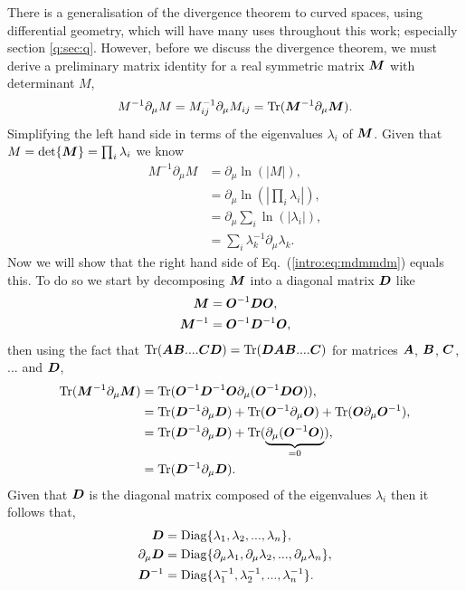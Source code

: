 There is a generalisation of the divergence theorem to curved spaces, using differential geometry, which will have many uses throughout this work; especially section \ref{q:sec:q}. However, before we discuss the divergence theorem, we must derive a preliminary matrix identity for a real symmetric matrix $\boldsymbol{M}$ with determinant $M$,
\begin{equation}\label{intro:eq:mdmmdm}
M^{-1} \partial_\mu M = M^{-1}_{ij} \partial_\mu M_{ij} = \mathrm{Tr}(\boldsymbol{M}^{-1} \partial_\mu \boldsymbol{M}).
\end{equation}
Simplifying the left hand side in terms of the eigenvalues $\lambda_i$ of $\boldsymbol{M}$. Given that $M=\det{\boldsymbol{M}}=\prod_i \lambda_i$ we know
\begin{align}
M^{-1} \partial_\mu M &= \partial_\mu \ln(|M|) ,\\
&= \partial_\mu \ln\left(\left| \prod_i \lambda_i\right|\right) ,\\
&= \partial_\mu \sum_i \ln(\left|  \lambda_i\right|) ,\\
&= \sum_i \lambda_k^{-1}\partial_\mu \lambda_k.
\end{align}
Now we will show that the right hand side of Eq.~(\ref{intro:eq:mdmmdm}) equals this. To do so we start by decomposing $\boldsymbol{M}$ into a diagonal matrix $\boldsymbol{D}$ like
\begin{align}
\boldsymbol{M} &= \boldsymbol{O}^{-1} \boldsymbol{D} \boldsymbol{O},\\
\boldsymbol{M}^{-1} &= \boldsymbol{O}^{-1} \boldsymbol{D}^{-1} \boldsymbol{O},
\end{align}
then using the fact that $\mathrm{Tr}(\boldsymbol{A} \boldsymbol{B} .... \boldsymbol{C}\boldsymbol{D}) = \mathrm{Tr}(\boldsymbol{D}\boldsymbol{A} \boldsymbol{B} .... \boldsymbol{C})$ for matrices $\boldsymbol{A}$, $ \boldsymbol{B}$, $ \boldsymbol{C}$, $...$ and $\boldsymbol{D}$,
\begin{align}
\mathrm{Tr}(\boldsymbol{M}^{-1} \partial_\mu \boldsymbol{M}) &= \mathrm{Tr}(\boldsymbol{O}^{-1} \boldsymbol{D}^{-1} \boldsymbol{O} \partial_\mu (\boldsymbol{O}^{-1} \boldsymbol{D} \boldsymbol{O})) ,\\
&= \mathrm{Tr}(\boldsymbol{D}^{-1} \partial_\mu \boldsymbol{D}) + \mathrm{Tr}(\boldsymbol{O}^{-1} \partial_\mu \boldsymbol{O}) +\mathrm{Tr}(\boldsymbol{O} \partial_\mu \boldsymbol{O}^{-1}) , \\
&= \mathrm{Tr}(\boldsymbol{D}^{-1} \partial_\mu \boldsymbol{D}) + \mathrm{Tr}( \underbrace{\partial_\mu (\boldsymbol{O}^{-1}\boldsymbol{O})}_{=0}) , \\
&= \mathrm{Tr}(\boldsymbol{D}^{-1} \partial_\mu \boldsymbol{D}) .
\end{align}
Given that $\boldsymbol{D}$ is the diagonal matrix composed of the eigenvalues $\lambda_i$ then it follows that,
\begin{align}
\boldsymbol{D} &= \mathrm{Diag}\{\lambda_1,\lambda_2,...,\lambda_n\} ,\\
\partial_\mu\boldsymbol{D} &= \mathrm{Diag}\{\partial_\mu\lambda_1,\partial_\mu\lambda_2,...,\partial_\mu\lambda_n\} ,\\
\boldsymbol{D}^{-1} &= \mathrm{Diag}\{\lambda^{-1}_1,\lambda^{-1}_2,...,\lambda^{-1}_n\} .
\end{align}
